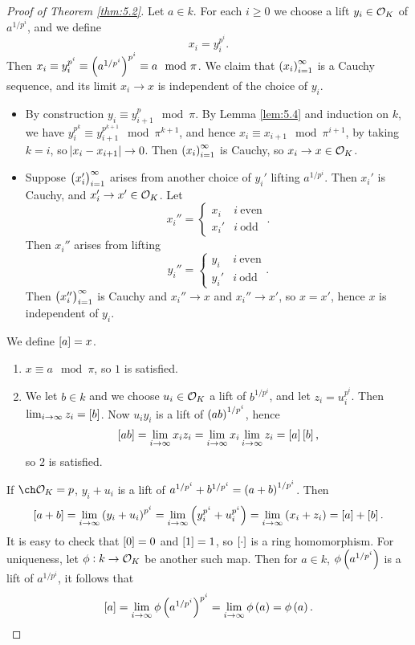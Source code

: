 \begin{proof}[Proof of Theorem \ref{thm:5.2}]
Let $ a \in k $. For each $ i \ge 0 $ we choose a lift $ y_i \in \mathcal{O}_K $ of $ a^{1 / p^i} $, and we define
$$ x_i = y_i^{p^i}. $$
Then $ x_i \equiv y_i^{p^i} \equiv \br{a^{1 / p^i}}^{p^i} \equiv a \mod \pi $. We claim that $ \br{x_i}_{i = 1}^\infty $ is a Cauchy sequence, and its limit $ x_i \to x $ is independent of the choice of $ y_i $.
\begin{itemize}
\item By construction $ y_i \equiv y_{i + 1}^p \mod \pi $. By Lemma \ref{lem:5.4} and induction on $ k $, we have $ y_i^{p^k} \equiv y_{i + 1}^{p^{k + 1}} \mod \pi^{k + 1} $, and hence $ x_i \equiv x_{i + 1} \mod \pi^{i + 1} $, by taking $ k = i $, so $ \abs{x_i - x_{i + 1}} \to 0 $. Then $ \br{x_i}_{i = 1}^\infty $ is Cauchy, so $ x_i \to x \in \mathcal{O}_K $.
\item Suppose $ \br{x_i'}_{i = 1}^\infty $ arises from another choice of $ y_i' $ lifting $ a^{1 / p^i} $. Then $ x_i' $ is Cauchy, and $ x_i' \to x' \in \mathcal{O}_K $. Let
$$ x_i'' =
\begin{cases}
x_i & i \ \text{even} \\
x_i' & i \ \text{odd}
\end{cases}.
$$
Then $ x_i'' $ arises from lifting
$$ y_i'' =
\begin{cases}
y_i & i \ \text{even} \\
y_i' & i \ \text{odd}
\end{cases}.
$$
Then $ \br{x_i''}_{i = 1}^\infty $ is Cauchy and $ x_i'' \to x $ and $ x_i'' \to x' $, so $ x = x' $, hence $ x $ is independent of $ y_i $.
\end{itemize}
We define $ \sbr{a} = x $.
\begin{enumerate}
\item $ x \equiv a \mod \pi $, so $ 1 $ is satisfied.
\item We let $ b \in k $ and we choose $ u_i \in \mathcal{O}_K $ a lift of $ b^{1 / p^i} $, and let $ z_i = u_i^{p^i} $. Then $ \lim_{i \to \infty} z_i = \sbr{b} $. Now $ u_iy_i $ is a lift of $ \br{ab}^{1 / p^i} $, hence
$$ \sbr{ab} = \lim_{i \to \infty} x_iz_i = \lim_{i \to \infty} x_i\lim_{i \to \infty} z_i = \sbr{a}\sbr{b}, $$
so $ 2 $ is satisfied.
\end{enumerate}

\pagebreak

If $ \ch \OOO_K = p $, $ y_i + u_i $ is a lift of $ a^{1 / p^i} + b^{1 / p^i} = \br{a + b}^{1 / p^i} $. Then
$$ \sbr{a + b} = \lim_{i \to \infty} \br{y_i + u_i}^{p^i} = \lim_{i \to \infty} \br{y_i^{p^i} + u_i^{p^i}} = \lim_{i \to \infty} \br{x_i + z_i} = \sbr{a} + \sbr{b}. $$
It is easy to check that $ \sbr{0} = 0 $ and $ \sbr{1} = 1 $, so $ \sbr{\cdot} $ is a ring homomorphism. For uniqueness, let $ \phi : k \to \mathcal{O}_K $ be another such map. Then for $ a \in k $, $ \phi\br{a^{1 / p^i}} $ is a lift of $ a^{1 / p^i} $, it follows that
$$ \sbr{a} = \lim_{i \to \infty} \phi\br{a^{1 / p^i}}^{p^i} = \lim_{i \to \infty} \phi\br{a} = \phi\br{a}. $$
\end{proof}

